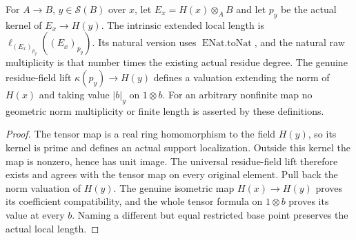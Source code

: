 \begin{definition}
\label{spectrum:nonetale-fibre-length}
\leanok
{}
For $A\to B$, $y\in\mathcal S(B)$ over $x$, let
$E_x=H(x)\otimes_AB$ and let $p_y$ be the actual kernel of $E_x\to H(y)$.
The intrinsic extended local length is $\ell_{(E_x)_{p_y}}((E_x)_{p_y})$.
Its natural version uses $\operatorname{ENat.toNat}$, and the natural raw
multiplicity is that number times the existing actual residue degree.
The genuine residue-field lift $\kappa(p_y)\to H(y)$ defines a valuation
extending the norm of $H(x)$ and taking value $|b|_y$ on $1\otimes b$.
For an arbitrary nonfinite map no geometric norm multiplicity or finite
length is asserted by these definitions.
\end{definition}
\begin{proof}
The tensor map is a real ring homomorphism to the field $H(y)$, so its
kernel is prime and defines an actual support localization. Outside this
kernel the map is nonzero, hence has unit image. The universal residue-field
lift therefore exists and agrees with the tensor map on every original
element. Pull back the norm valuation of $H(y)$. The genuine isometric map
$H(x)\to H(y)$ proves its coefficient compatibility, and the whole tensor
formula on $1\otimes b$ proves its value at every $b$. Naming a different
but equal restricted base point preserves the actual local length.
\end{proof}

